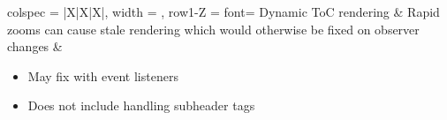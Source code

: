\documentclass[7px]{article}
\begin{document}
{
  \raggedright
  \begin{tblr}{
      colspec = {|X|X|X|}, width = \linewidth,
      row{1-Z} = {font=\scriptsize}
    }
    Dynamic ToC rendering & {Rapid zooms can cause stale rendering which would otherwise be fixed on observer changes} & {
      \begin{itemize}
        \item May fix with event listeners
        \item Does not include handling subheader tags
      \end{itemize}
    } \\
  \end{tblr}
}

\end{document}
